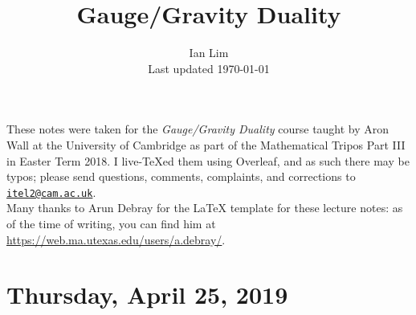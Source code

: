 \documentclass[reqno]{amsart}
\begin{document}
\title{Gauge/Gravity Duality}
\author{Ian Lim\\ Last updated \today}
\maketitle
{\small\noindent These notes were taken for the \textit{Gauge/Gravity Duality} course taught by Aron Wall at the University of Cambridge as part of the Mathematical Tripos Part III in Easter Term 2018. I live-\TeX ed them using Overleaf, and as such there may be typos; please send questions, comments, complaints, and corrections to 
\href{mailto:itel2@cam.ac.uk?subject=GGD\%20Lecture\%20Notes}{\texttt{itel2@cam.ac.uk}}.\\
Many thanks to Arun Debray for the {\LaTeX} template for these lecture notes: as of the time of writing, you can find him at \url{https://web.ma.utexas.edu/users/a.debray/}.}

\tableofcontents

\section{Thursday, April 25, 2019}
	
	
\end{document}
